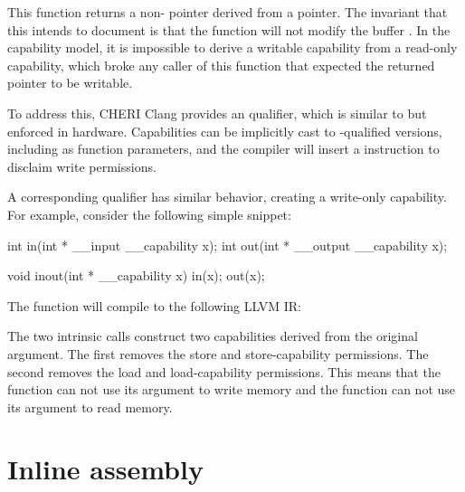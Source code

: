 This function returns a non- pointer derived from a  pointer.
The invariant that this intends to document is that the  function will not modify the buffer .
In the capability model, it is impossible to derive a writable capability from a read-only capability, which broke any caller of this function that expected the returned pointer to be writable.

To address this, CHERI Clang provides an  qualifier, which is similar to  but enforced in hardware.
Capabilities can be implicitly cast to -qualified versions, including as function parameters, and the compiler will insert a  instruction to disclaim write permissions.

A corresponding  qualifier has similar behavior, creating a write-only capability.
For example, consider the following simple snippet:

\begin{csnippet}
int in(int * __input __capability x);
int out(int * __output __capability x);

void inout(int * __capability x)
{
	in(x);
	out(x);
}
\end{csnippet}

The  function will compile to the following LLVM IR:


The two intrinsic calls construct two capabilities derived from the original argument.
The first removes the store and store-capability permissions.
The second removes the load and load-capability permissions.
This means that the  function can not use its argument to write memory and the  function can not use its argument to read memory.

\section{Inline assembly}

